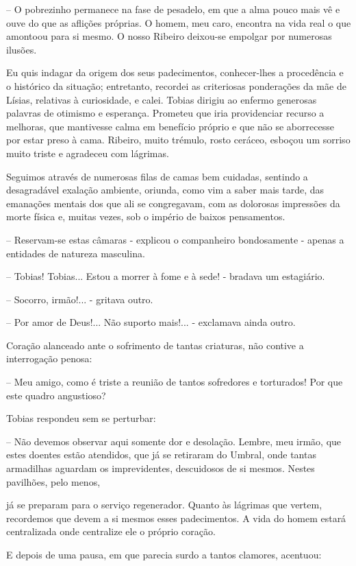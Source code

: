 \documentclass[portuguese,12pt,a4paper]{scrbook}
\begin{document}
	– O pobrezinho permanece na fase de pesadelo, em que a alma pouco mais vê e ouve do que as aflições próprias. O homem, meu caro, encontra na vida real o que amontoou para si mesmo. O nosso Ribeiro deixou-se empolgar por numerosas ilusões.
	
	
	Eu quis indagar da origem dos seus padecimentos, conhecer-lhes a procedência e o histórico da situação; entretanto, recordei as criteriosas ponderações da mãe de Lísias, relativas à curiosidade, e calei. Tobias dirigiu ao enfermo generosas palavras de otimismo e esperança. Prometeu que iria providenciar recurso a melhoras, que mantivesse calma em benefício próprio e que não se aborrecesse por estar preso à cama. Ribeiro, muito trémulo, rosto ceráceo, esboçou um sorriso muito triste e agradeceu com lágrimas.
	
	Seguimos através de numerosas filas de camas bem cuidadas, sentindo a desagradável exalação ambiente, oriunda, como vim a saber mais tarde, das emanações mentais dos que ali se congregavam, com as dolorosas impressões da morte física e, muitas vezes, sob o império de baixos pensamentos.
	
	– Reservam-se estas câmaras - explicou o companheiro bondosamente - apenas a entidades de natureza masculina.
	
	– Tobias! Tobias... Estou a morrer à fome e à sede! - bradava um estagiário.
	
	– Socorro, irmão!... - gritava outro.
	
	– Por amor de Deus!... Não suporto mais!... - exclamava ainda outro.
	
	Coração alanceado ante o sofrimento de tantas criaturas, não contive a interrogação penosa:
	
	– Meu amigo, como é triste a reunião de tantos sofredores e torturados! Por que este quadro angustioso?
	
	Tobias respondeu sem se perturbar:
	
	– Não devemos observar aqui somente dor e desolação. Lembre, meu irmão, que estes doentes estão atendidos, que já se retiraram do Umbral, onde tantas armadilhas aguardam os imprevidentes, descuidosos de si mesmos. Nestes pavilhões, pelo menos,
	
	
	já se preparam para o serviço regenerador. Quanto às lágrimas que vertem, recordemos que devem a si mesmos esses padecimentos. A vida do homem estará centralizada onde centralize ele o próprio coração.
	
	E depois de uma pausa, em que parecia surdo a tantos clamores, acentuou:
	
\end{document}
